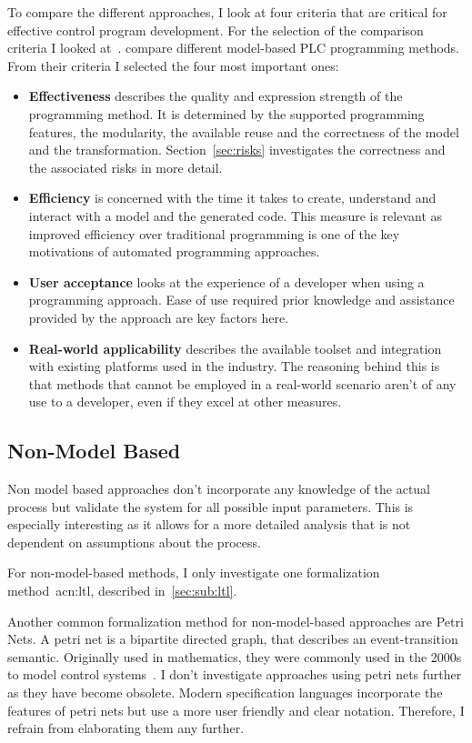 To compare the different approaches, I look at four criteria that are critical for effective control program development.
For the selection of the comparison criteria I looked at~\cite{VH:2014}.
\citeauthor{VH:2014} compare different model-based PLC programming methods.
From their criteria I selected the four most important ones:
\begin{itemize}
	\item \textbf{Effectiveness} describes the quality and expression strength of the programming method.
	It is determined by the supported programming features, the modularity, the available reuse and the correctness of the model and the transformation.
	Section~\ref{sec:risks} investigates the correctness and the associated risks in more detail.
	\item \textbf{Efficiency} is concerned with the time it takes to create, understand and interact with a model and the generated code.
	This measure is relevant as improved efficiency over traditional programming is one of the key motivations of automated programming approaches.
	\item \textbf{User acceptance} looks at the experience of a developer when using a programming approach.
	Ease of use required prior knowledge and assistance provided by the approach are key factors here.
	\item \textbf{Real-world applicability} describes the available toolset and integration with existing platforms used in the industry.
	The reasoning behind this is that methods that cannot be employed in a real-world scenario aren't of any use to a developer, even if they excel at other measures.
\end{itemize}

\subsection{Non-Model Based}
\label{sec:non_model}

Non model based approaches don't incorporate any knowledge of the actual process but validate the system for all possible input parameters.
This is especially interesting as it allows for a more detailed analysis that is not dependent on assumptions about the process.

For non-model-based methods, I only investigate one formalization method~\acrlong{acn:ltl}, described in~\ref{sec:sub:ltl}.

Another common formalization method for non-model-based approaches are Petri Nets.
A petri net is a bipartite directed graph, that describes an event-transition semantic.
Originally used in mathematics, they were commonly used in the 2000s to model control systems~\cite{Frey:2000:2, Frey:2000aa}.
I don't investigate approaches using petri nets further as they have become obsolete.
Modern specification languages incorporate the features of petri nets but use a more user friendly and clear notation.
Therefore, I refrain from elaborating them any further.

